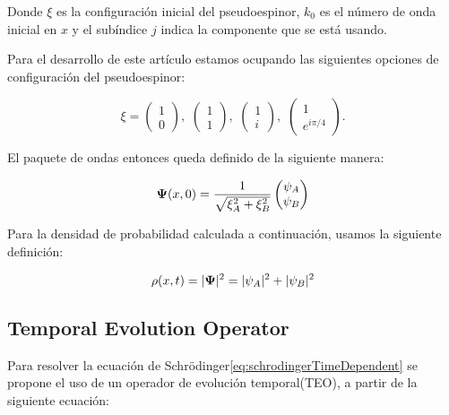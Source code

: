 \noindent Donde $\xi$ es la configuración inicial del pseudoespinor, $k_0$ es el número de onda inicial en $x$ y el subíndice $j$ indica la componente que se está usando.

Para el desarrollo de este artículo estamos ocupando las siguientes opciones de configuración del pseudoespinor:

\begin{equation}
    \label{eq:pseudospinorConfigurations}
    \xi=\begin{pmatrix}
            1\\0
    \end{pmatrix},\,\,\begin{pmatrix}
                          1\\1
    \end{pmatrix},\,\,\begin{pmatrix}
                          1\\i
    \end{pmatrix},\,\,\begin{pmatrix}
                          1\\e^{i\pi/4}
    \end{pmatrix}.
\end{equation}

El paquete de ondas entonces queda definido de la siguiente manera:

\begin{equation}
    \label{eq:FinalGWP}
    \mbox{\boldmath $\Psi$}(x,0)=\frac{1}{\sqrt {\xi_A^2 + \xi_B^2}}\begin{pmatrix}
                                                          \psi_A\\\psi_B
    \end{pmatrix}
\end{equation}

Para la densidad de probabilidad calculada a continuación, usamos la siguiente definición:

\begin{equation}
    \label{eq:probDens}
    \rho(x,t)=|\mbox{\boldmath $\Psi$}|^2 = |\psi_A|^2+|\psi_B|^2
\end{equation}

\subsection{Temporal Evolution Operator}\label{subsec:temporal-evolution-operator}
Para resolver la ecuación de Schrödinger\eqref{eq:schrodingerTimeDependent} se propone el uso de un operador de evolución temporal(TEO), a partir de la siguiente ecuación:

